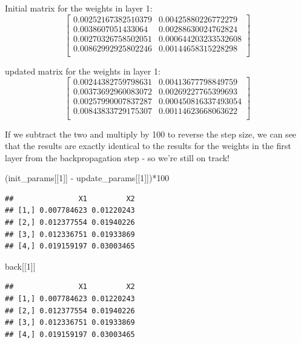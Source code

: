 \documentclass[
]{article}
\newenvironment{Shaded}{\begin{snugshade}}{\end{snugshade}}
\newcommand{\DecValTok}[1]{\textcolor[rgb]{0.00,0.00,0.81}{#1}}
\newcommand{\NormalTok}[1]{#1}
\newcommand{\SpecialCharTok}[1]{\textcolor[rgb]{0.00,0.00,0.00}{#1}}
\begin{document}
Initial matrix for the weights in layer 1: \[\begin{bmatrix}
0.00252167382510379&0.00425880226772279 \\
0.0038607051433064&0.00288630024762824 \\
0.00270326758502051&0.000644203233532608 \\
0.00862992925802246&0.00144658315228298 \\
\end{bmatrix}\]

updated matrix for the weights in layer 1: \[\begin{bmatrix}
0.00244382759798631&0.00413677798849759 \\
0.00373692960083072&0.00269227765399693 \\
0.00257990007837287&0.000450816337493054 \\
0.00843833729175307&0.00114623668063622 \\
\end{bmatrix}\]

If we subtract the two and multiply by 100 to reverse the step size, we
can see that the results are exactly identical to the results for the
weights in the first layer from the backpropagation step - so we're
still on track!

\begin{Shaded}
\begin{Highlighting}[]
\NormalTok{(init\_params[[}\DecValTok{1}\NormalTok{]] }\SpecialCharTok{{-}}\NormalTok{ update\_params[[}\DecValTok{1}\NormalTok{]])}\SpecialCharTok{*}\DecValTok{100}
\end{Highlighting}
\end{Shaded}

\begin{verbatim}
##               X1         X2
## [1,] 0.007784623 0.01220243
## [2,] 0.012377554 0.01940226
## [3,] 0.012336751 0.01933869
## [4,] 0.019159197 0.03003465
\end{verbatim}

\begin{Shaded}
\begin{Highlighting}[]
\NormalTok{back[[}\DecValTok{1}\NormalTok{]]}
\end{Highlighting}
\end{Shaded}

\begin{verbatim}
##               X1         X2
## [1,] 0.007784623 0.01220243
## [2,] 0.012377554 0.01940226
## [3,] 0.012336751 0.01933869
## [4,] 0.019159197 0.03003465
\end{verbatim}
\end{document}
